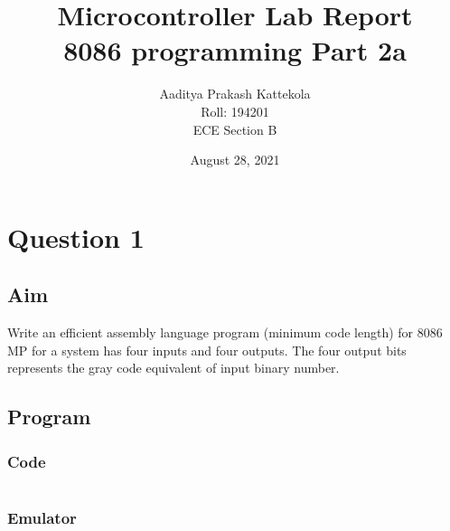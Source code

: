 \documentclass{article}
\title{
	Microcontroller Lab Report \\
\large 8086 programming Part 2a
} %
\author{
	Aaditya Prakash Kattekola \\
	{\small Roll: 194201} \\
	{\small ECE Section B} \\
} %
\date{August 28, 2021} %
\begin{document}
\maketitle %



\break
\section{Question 1}

\subsection{Aim}
Write an efficient assembly language program (minimum code length) for 8086 MP for a system has four inputs and four outputs. The four output bits represents the gray code equivalent of input binary number.

\subsection{Program}
\subsubsection{Code}
\inputminted{nasm}{"C:/Users/aadit/Documents/BTech/5th Semester/MC Lab/8086 Pgrm 2/2A/GRAY_CODE.asm"}

\subsubsection{Emulator}
\end{document}
